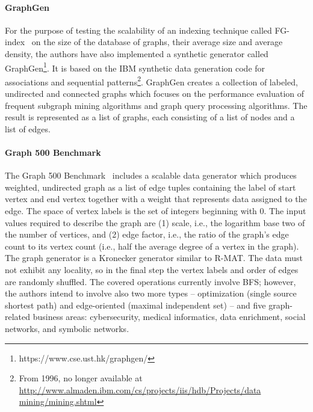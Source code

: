 \paragraph{GraphGen} For the purpose of testing the scalability of an indexing
technique called FG-index~\cite{Cheng:2007:FTV:1247480.1247574} on the size of the
database of graphs, their average size and average density, the authors have
also implemented a synthetic generator called
GraphGen\footnote{https://www.cse.ust.hk/graphgen/}. It is
based on the IBM synthetic data generation code for associations and sequential
patterns\footnote{From 1996, no longer available at
\url{http://www.almaden.ibm.com/cs/projects/iis/hdb/Projects/data
mining/mining.shtml}}. GraphGen creates a collection of labeled, undirected and
connected graphs which focuses on the performance evaluation of frequent subgraph mining
algorithms and graph query processing algorithms. The result is represented as a
list of graphs, each consisting of a list of nodes and a list of edges.




\paragraph{Graph 500 Benchmark} The Graph 500 Benchmark~\cite{Graph500} includes
a scalable data generator which produces weighted, undirected graph as a list of
edge tuples containing the label of start vertex and end vertex together with a
weight that represents data assigned to the edge. The space of vertex  labels is
the set of integers beginning with 0. The input values required to describe the
graph are (1) scale, i.e., the logarithm base two of the number of vertices, and
(2) edge factor, i.e., the ratio of the graph's edge count to its vertex count
(i.e., half the average degree of a vertex in the graph). The graph generator is
a Kronecker generator similar to R-MAT. The data must not exhibit any locality,
so in the final step the vertex labels and order of edges are randomly shuffled.
The covered operations currently involve BFS; however, the authors intend to
involve also two more types -- optimization (single source shortest path) and
edge-oriented (maximal independent set) -- and five graph-related business areas:
cybersecurity, medical informatics, data enrichment, social networks, and
symbolic networks.

